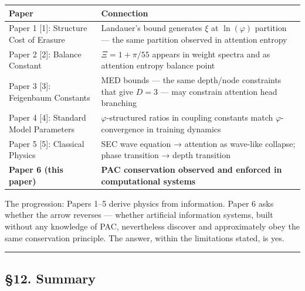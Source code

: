 \documentclass[
  11pt,
  a4paper]{article}
\begin{document}
\begin{longtable}[]{@{}
  >{\raggedright\arraybackslash}p{}
  >{\raggedright\arraybackslash}p{}@{}}
\toprule\noalign{}
\begin{minipage}[b]{\linewidth}\raggedright
Paper
\end{minipage} & \begin{minipage}[b]{\linewidth}\raggedright
Connection
\end{minipage} \\
\midrule\noalign{}
\endhead
\bottomrule\noalign{}
\endlastfoot
Paper 1 {[}1{]}: Structure Cost of Erasure & Landauer's bound generates
\(\xi\) at \(\ln(\varphi)\) partition --- the same partition observed in
attention entropy \\
Paper 2 {[}2{]}: Balance Constant & \(\Xi = 1 + \pi/55\) appears in
weight spectra and as attention entropy balance point \\
Paper 3 {[}3{]}: Feigenbaum Constants & MED bounds --- the same
depth/node constraints that give \(D = 3\) --- may constrain attention
head branching \\
Paper 4 {[}4{]}: Standard Model Parameters & \(\varphi\)-structured
ratios in coupling constants match \(\varphi\)-convergence in training
dynamics \\
Paper 5 {[}5{]}: Classical Physics & SEC wave equation → attention as
wave-like collapse; phase transition → depth transition \\
\textbf{Paper 6 (this paper)} & \textbf{PAC conservation observed and
enforced in computational systems} \\
\end{longtable}

The progression: Papers 1--5 derive physics from information. Paper 6
asks whether the arrow reverses --- whether artificial information
systems, built without any knowledge of PAC, nevertheless discover and
approximately obey the same conservation principle. The answer, within
the limitations stated, is yes.

\begin{center}\rule{0.5\linewidth}{0.5pt}\end{center}

\subsection{§12. Summary}\label{summary}
\end{document}
